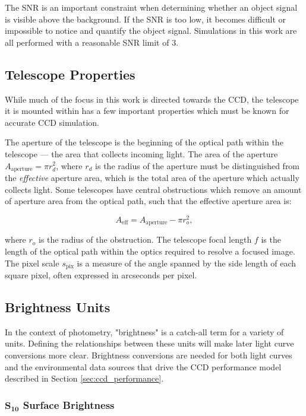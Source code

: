 The SNR is an important constraint when determining whether an object signal is visible above the background. If the SNR is too low, it becomes difficult or impossible to notice and quantify the object signal. Simulations in this work are all performed with a reasonable SNR limit of $3$.

\subsection{Telescope Properties} \label{sec:telescope_properties}

While much of the focus in this work is directed towards the CCD, the telescope it is mounted within has a few important properties which must be known for accurate CCD simulation. 

The aperture of the telescope is the beginning of the optical path within the telescope --- the area that collects incoming light. The area of the aperture $A_\mathrm{aperture} = \pi r_{d}^2$, where $r_d$ is the radius of the aperture must be distinguished from the \textit{effective} aperture area, which is the total area of the aperture which actually collects light. Some telescopes have central obstructions which remove an amount of aperture area from the optical path, such that the effective aperture area is:

\begin{equation}
  A_\mathrm{eff} = A_\mathrm{aperture} - \pi r_{o}^2,
\end{equation}

where $r_o$ is the radius of the obstruction. The telescope focal length $f$ is the length of the optical path within the optics required to resolve a focused image. The pixel scale $s_\mathrm{pix}$ is a measure of the angle spanned by the side length of each square pixel, often expressed in arcseconds per pixel. 

\subsection{Brightness Units}

In the context of photometry, "brightness" is a catch-all term for a variety of units. Defining the relationships between these units will make later light curve conversions more clear. Brightness conversions are needed for both light curves and the environmental data sources that drive the CCD performance model described in Section \ref{sec:ccd_performance}.

\subsubsection{$\mathbf{S_{10}}$ Surface Brightness}

